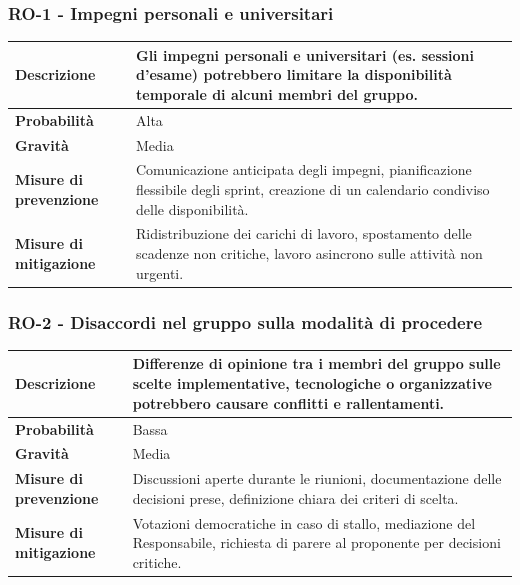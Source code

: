 \documentclass[11pt,a4paper]{article}
\begin{document}
\subsubsection{RO-1 - Impegni personali e universitari}
\begin{center}
\begin{tabular}{|p{3cm}|p{12cm}|}
    \hline
    \textbf{Descrizione} & Gli impegni personali e universitari (es. sessioni d'esame) potrebbero limitare la disponibilità temporale di alcuni membri del gruppo. \\
    \hline
    \textbf{Probabilità} & Alta \\
    \hline
    \textbf{Gravità} & Media \\
    \hline
    \textbf{Misure di prevenzione} & Comunicazione anticipata degli impegni, pianificazione flessibile degli sprint, creazione di un calendario condiviso delle disponibilità. \\
    \hline
    \textbf{Misure di mitigazione} & Ridistribuzione dei carichi di lavoro, spostamento delle scadenze non critiche, lavoro asincrono sulle attività non urgenti. \\
    \hline
\end{tabular}
\end{center}

\subsubsection{RO-2 - Disaccordi nel gruppo sulla modalità di procedere}
\begin{center}
\begin{tabular}{|p{3cm}|p{12cm}|}
    \hline
    \textbf{Descrizione} & Differenze di opinione tra i membri del gruppo sulle scelte implementative, tecnologiche o organizzative potrebbero causare conflitti e rallentamenti. \\
    \hline
    \textbf{Probabilità} & Bassa \\
    \hline
    \textbf{Gravità} & Media \\
    \hline
    \textbf{Misure di prevenzione} & Discussioni aperte durante le riunioni, documentazione delle decisioni prese, definizione chiara dei criteri di scelta. \\
    \hline
    \textbf{Misure di mitigazione} & Votazioni democratiche in caso di stallo, mediazione del Responsabile, richiesta di parere al proponente per decisioni critiche. \\
    \hline
\end{tabular}
\end{center}
\end{document}
